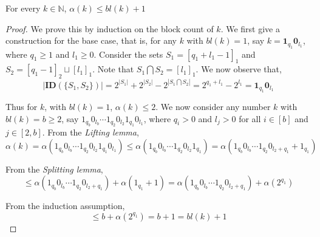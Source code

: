 \documentclass[10pt,a4paper]{amsart}
\begin{document}
\begin{lemma}\label{simple_upper_bound}
	For every $k\in \mathbb{N}$, $\alpha(k)\leq {bl(k)}+1$    
\end{lemma}

\begin{proof}
	We prove this by induction on the block count of $k$. We first give a 
	construction for the base case, that is, for any $k$ with $bl(k)=1$, say 
	$k=\mathbf{1}_{q_1} \mathbf{0}_{l_1}$, where $q_1\geq 1$ and $l_1\geq 0$. 
	Consider the sets $S_1=[q_1+l_1-1]_1$ and $S_2=[q_1-1]_2\sqcup [l_1]_1$. 
	Note that $S_1 \bigcap S_2 = [l_1]_1$. We now observe that,
	$$ |\mathbf{ID}(\{S_1,S_2\})| = 2^{|S_1|}+2^{|S_2|}-2^{|S_1\bigcap S_2|} = 
	2^{q_1+l_1}-2^{l_1} = \mathbf{1}_{q_1} \mathbf{0}_{l_1}$$
	
	Thus for $k$, with $bl(k)=1$, $\alpha(k) \leq 2$. We now consider any number 
	$k$ with $bl(k)=b \geq 2$, say $1_{q_b}0_{l_b}\cdots1_{q_2}0_{l_2}1_{q_1}
	0_{l_1}$, where $q_i> 0$ and $l_j> 0$ for all $i\in [b]$ and $j \in [2,b]$. 
	From the \textit{Lifting lemma}, 
	$$\alpha(k) = \alpha (1_{q_b}0_{l_b}\cdots1_{q_2}0_{l_2}1_{q_1}0_{l_1}) 
	\leq \alpha (1_{q_b}0_{l_b}\cdots1_{q_2}0_{l_2}1_{q_1}) = \alpha 
	(1_{q_b}0_{l_b}\cdots1_{q_2}0_{l_2+q_1}+1_{q_1})$$
	
	From the \textit{Splitting lemma}, 
	$$ \leq \alpha (1_{q_b}0_{l_b}\cdots1_{q_2}0_{l_2+q_1})+\alpha(1_{q_1}+1) = 
	\alpha (1_{q_b}0_{l_b}\cdots1_{q_2}0_{l_2+q_1})+\alpha(2^{q_1})$$
	
	From the induction assumption, 
	$$ \leq b+\alpha(2^{q_1}) = b+1=bl(k)+1$$
\end{proof}
\end{document}
